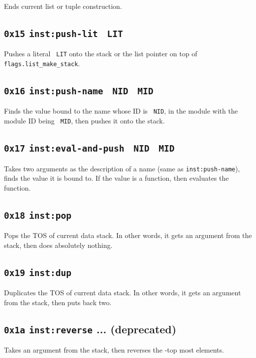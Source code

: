 \documentclass{report}
\newcommand{\mtilde}[1]{\textasciitilde}
\newcommand{\marg}[1]{\texttt{\mtilde ~#1}}
\newcommand{\inst}[1] {\texttt{inst:#1}}
\begin{document}
Ends current list or tuple construction.

\subsection{\texttt{0x15} \inst{push-lit} \marg{LIT}}

Pushes a literal \marg{LIT} onto the stack or the list pointer on top of \texttt{flags.list\_make\_stack}.

\subsection{\texttt{0x16} \inst{push-name} \marg{NID} \marg{MID}}

Finds the value bound to the name whose ID is \marg{NID}, in the module with the module ID being \marg{MID}, then pushes it onto the stack.

\subsection{\texttt{0x17} \inst{eval-and-push} \marg{NID} \marg{MID}}

Takes two arguments as the description of a name (same as \inst{push-name}), finds the value it is bound to. If the value is a function, then evaluates the function.

\subsection{\texttt{0x18} \inst{pop} }

Pops the TOS of current data stack. In other words, it gets an argument from the stack, then does absolutely nothing.

\subsection{\texttt{0x19} \inst{dup} }

Duplicates the TOS of current data stack. In other words, it gets an argument from the stack, then puts back two.

\subsection{\texttt{0x1a} \inst{reverse}    ...  (deprecated)}

Takes an argument from the stack, then reverses the -top most elements.
\end{document}

